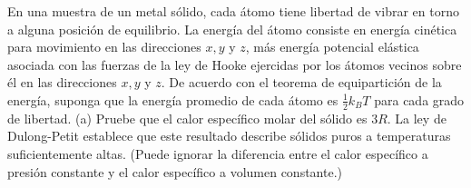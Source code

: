 \item En una muestra de un metal sólido, cada átomo tiene libertad de vibrar en torno a alguna posición de equilibrio. La energía del átomo consiste en energía cinética para movimiento en las direcciones $x, y$ y $z$, más energía potencial elástica asociada con las fuerzas de la ley de Hooke ejercidas por los átomos vecinos sobre él en las direcciones $x, y$ y $z$. De acuerdo con el teorema de equipartición de la energía, suponga que la energía promedio de cada átomo es $\frac{1}{2}k_BT$ para cada grado de libertad. (a) Pruebe que el calor específico molar del sólido es $3R$. La ley de Dulong-Petit establece que este resultado describe sólidos puros a temperaturas suficientemente altas. (Puede ignorar la diferencia entre el calor específico a presión constante y el calor específico a volumen constante.)
